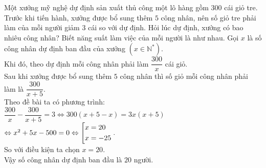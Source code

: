 \begin{ex}%
 Một xưởng mỹ nghệ dự định sản xuất thủ công một lô hàng gồm $300$ cái giỏ tre. Trước khi tiến hành, xưởng được bổ sung thêm $5$ công nhân, nên số giỏ tre phải làm của mỗi người giảm $3$ cái so với dự định. Hỏi lúc dự định, xưởng có bao nhiêu công nhân? Biết năng suất làm việc của mỗi người là như nhau. 
\loigiai
    {
    Gọi $x$ là số công nhân dự định ban đầu của xưởng $(x \in \mathbb{N}^*)$.\\
    Khi đó, theo dự định mỗi công nhân phải làm $\dfrac{300}{x}$ cái giỏ.\\
    Sau khi xưởng được bổ sung thêm $5$ công nhân thì số giỏ mỗi công nhân phải làm là $\dfrac{300}{x + 5}$.\\
    Theo đề bài ta có phương trình:\\
    $\dfrac{300}{x} - \dfrac{300}{x + 5} = 3 \Leftrightarrow 300(x + 5 - x) = 3x(x + 5)$
    $\Leftrightarrow x^2 + 5x - 500 = 0 \Leftrightarrow \left[\begin{aligned}& x = 20 \\ & x = -25\end{aligned}\right..$\\
    So với điều kiện ta chọn $x = 20$.\\
    Vậy số công nhân dự định ban đầu là $20$ người.
    }
\end{ex}


